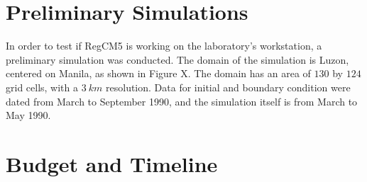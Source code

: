\section{Preliminary Simulations}
	In order to test if RegCM5 is working on the laboratory's workstation,
		a preliminary simulation was conducted.
	The domain of the simulation is Luzon, centered on Manila, as shown in Figure X.
	The domain has an area of $\num{130}$ by $\num{124}$ grid cells, with a $\qty{3}{km}$ resolution.
	Data for initial and boundary condition were dated from March to September 1990,
		and the simulation itself is from March to May 1990.
	

\section{Budget and Timeline}